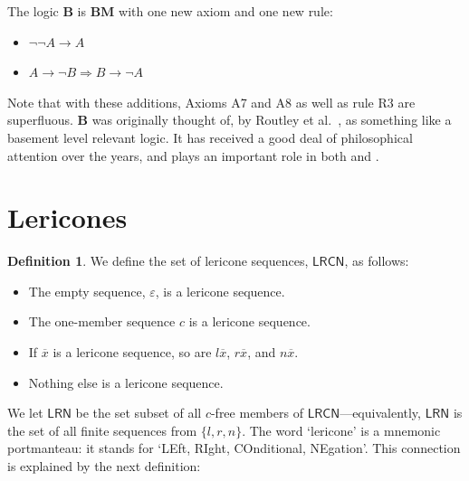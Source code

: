 \documentclass{amsart}
\theoremstyle{definition}
\newtheorem{mdef}{Definition}
\newcommand{\LRN}{\mathsf{LRN}}
\newcommand{\LRCN}{\mathsf{LRCN}}
\newcommand{\BM}{\mathbf{BM}}
\begin{document}
The logic $\mathbf{B}$ is $\BM$ with one new axiom and one new rule:
\begin{itemize}
    \item[(A9)] $\neg\neg A\to A$
    \item[(R5)] $A\to\neg B\Rightarrow B\to\neg A$
\end{itemize}
Note that with these additions, Axioms A7 and A8 as well as rule R3 are superfluous. $\mathbf{B}$ was originally thought of, by Routley et al.~\citeyearpar{routley1982}, as something like a basement level relevant logic. It has received a good deal of philosophical attention over the years, and plays an important role in both \citet{Read1988} and \citet{Logan:2023aa}.

\section{Lericones}\label{Section:Lericones}

\begin{mdef}
    We define the set of lericone sequences, $\LRCN$, as follows:
    \begin{itemize}
        \item The empty sequence, $\varepsilon$, is a lericone sequence.
        \item The one-member sequence $c$ is a lericone sequence.
        \item If $\overline{x}$ is a lericone sequence, so are $l\overline{x}$, $r\overline{x}$, and $n\overline{x}$.
        \item Nothing else is a lericone sequence.
    \end{itemize}
\end{mdef}


We let $\LRN$ be the set subset of all $c$-free members of $\LRCN$---equivalently, $\LRN$ is the set of all finite sequences from $\{l,r,n\}$. The word `lericone' is a mnemonic portmanteau: it stands for `LEft, RIght, COnditional, NEgation'. This connection is explained by the next definition:
\end{document}
